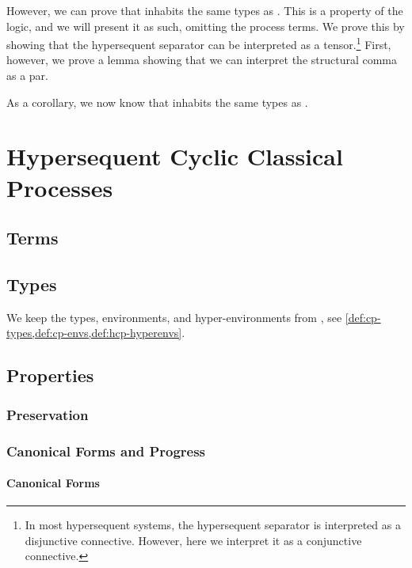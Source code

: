 \documentclass{article}
\begin{document}
However, we can prove that \hcp inhabits the same types as \cp. This is a
property of the logic, and we will present it as such, omitting the process
terms. We prove this by showing that the hypersequent separator can be
interpreted as a tensor.\footnote{%
  In most hypersequent systems, the hypersequent separator is interpreted as a
  disjunctive connective. However, here we interpret it as a conjunctive
  connective.}
First, however, we prove a lemma showing that we can interpret the structural
comma as a par.


As a corollary, we now know that \hcp inhabits the same types as \cp.



\section{Hypersequent Cyclic Classical Processes}\label{sec:hccp}

\subsection{Terms}\label{sec:hccp-term}




\subsection{Types}\label{sec:hccp-types}
We keep the types, environments, and hyper-environments from \hcp, see
\cref{def:cp-types,def:cp-envs,def:hcp-hyperenvs}.


\subsection{Properties}\label{sec:hccp-properties}

\subsubsection{Preservation}\label{sec:hccp-preservation}




\subsubsection{Canonical Forms and Progress}\label{sec:hccp-canonical-forms-and-progress}

\paragraph{Canonical Forms}\label{sec:hccp-canonical-forms}

\end{document}
